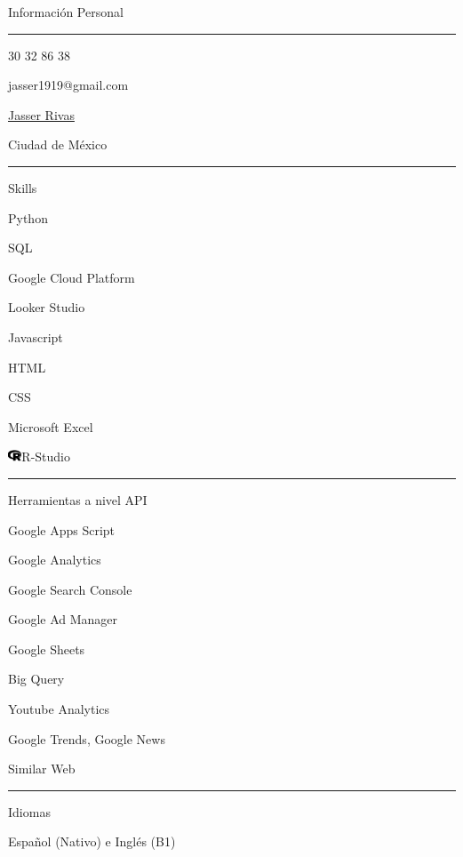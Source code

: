 \documentclass{article}
\begin{document}
\begin{minipage}[t]{0.40\textwidth}
\setlength{\baselineskip}{1.5\baselineskip}
\color{white}
\vspace{.5cm}
{\large Información Personal}

\rule{\linewidth}{0.4pt}

\faPhone\quad  \faWhatsapp{} 30 32 86 38



\faEnvelope\quad jasser1919@gmail.com



\href{https://www.linkedin.com/in/jasser-abad-rivas-hernandez-289421209/}{\faLinkedin\quad Jasser Rivas}

\faMapMarker\quad Ciudad de México


%



\rule{\linewidth}{0.4pt}

{\large Skills}

\faPython\quad Python



\faDatabase\quad SQL



\faCloud\quad Google Cloud Platform

\faChartLine\quad Looker Studio


\faJs\quad Javascript

 \quad HTML

\quad CSS


\faWindows\quad Microsoft Excel



\includegraphics[width=0.16in, decodearray={1 0 1 0 1 0}]{r-project.png}\quad R-Studio




\rule{\linewidth}{0.4pt}

{\large Herramientas a nivel API}

\faGoogle\quad Google Apps Script

\faChartLine\quad Google Analytics

\faSearchengin\quad Google Search Console

\faFilter\quad Google Ad Manager

\faTable\quad Google Sheets

\faDatabase\quad Big Query

\faYoutube\quad Youtube Analytics

\faNewspaper\quad Google Trends, Google News

\faGlobe\quad Similar Web






\rule{\linewidth}{0.4pt}

{\large Idiomas}

\faLanguage \quad Español (Nativo) e Inglés (B1)

\end{minipage}
\end{document}
